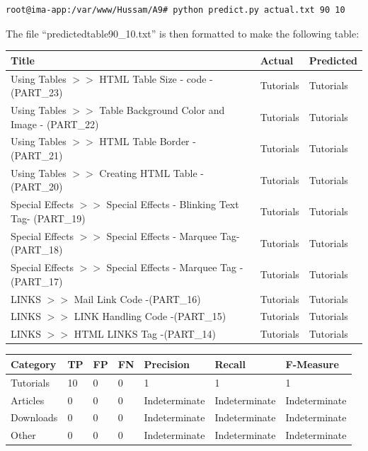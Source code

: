 \documentclass[a4paper, 11pt]{article}
\begin{document}
\begin{lstlisting}[language=bash, breakatwhitespace=〈false), label=Running predict.py: Training 90 Predicting 10, caption= Running predict.py: Training 90 Predicting 10]
root@ima-app:/var/www/Hussam/A9# python predict.py actual.txt 90 10
\end{lstlisting}


The file ``predictedtable90\_10.txt'' is then formatted to make the following table:

\begin{longtable}{ |p{10cm}|p{2cm}|p{2cm}| }
\hline
Title
&
Actual
&
Predicted \\
\hline
Using Tables  $>>$ HTML Table Size - code  - (PART\_23)
&
Tutorials
&
Tutorials \\
\hline
Using Tables $>>$ Table Background Color and Image - (PART\_22)
&
Tutorials
&
Tutorials \\
\hline
Using Tables $>>$ HTML Table Border - (PART\_21)
&
Tutorials
&
Tutorials \\
\hline
Using Tables $>>$ Creating HTML Table - (PART\_20)
&
Tutorials
&
Tutorials \\
\hline
Special Effects $>>$ Special Effects - Blinking Text Tag- (PART\_19)
&
Tutorials
&
Tutorials \\
\hline
Special Effects $>>$ Special Effects - Marquee Tag- (PART\_18)
&
Tutorials
&
Tutorials \\
\hline
Special Effects $>>$ Special Effects - Marquee Tag -(PART\_17)
&
Tutorials
&
Tutorials \\
\hline
LINKS $>>$ Mail Link Code -(PART\_16)
&
Tutorials
&
Tutorials \\
\hline
LINKS $>>$ LINK Handling Code  -(PART\_15)
&
Tutorials
&
Tutorials \\
\hline
LINKS  $>>$   HTML LINKS Tag  -(PART\_14)
&
Tutorials
&
Tutorials \\
\hline
\end{longtable}

\begin{longtable}{ |p{2cm}|p{0.5cm}|p{0.5cm}|p{0.5cm}|p{2.5cm}|p{2.5cm}|p{2.5cm}| }
\hline
Category
&
TP
&
FP
&
FN
&
Precision
&
Recall
&
F-Measure \\
\hline
Tutorials
&
10
&
0
&
0
&
1
&
1
&
1 \\
\hline
Articles
&
0
&
0
&
0
&
Indeterminate
&
Indeterminate
&
Indeterminate \\
\hline
Downloads
&
0
&
0
&
0
&
Indeterminate
&
Indeterminate
&
Indeterminate \\
\hline
Other
&
0
&
0
&
0
&
Indeterminate
&
Indeterminate
&
Indeterminate \\
\hline
\end{longtable}
\end{document}

